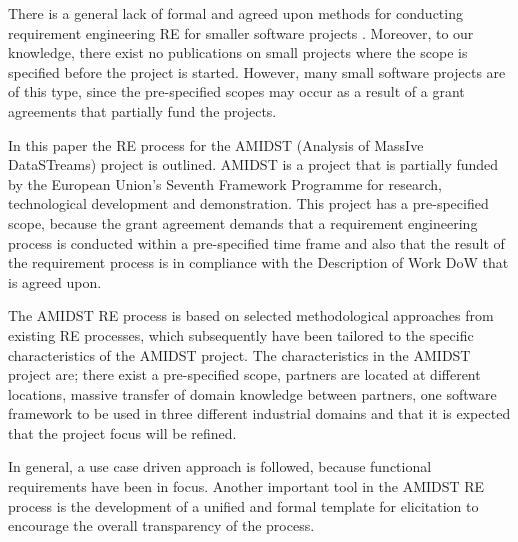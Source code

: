 There is a general lack of formal and agreed upon methods for conducting requirement engineering RE for smaller software projects \cite{Ara07,Qui10}.  Moreover, to our knowledge, there exist no publications on small projects where the scope is specified before the project is started.  However, many small software projects are of this type, since the pre-specified scopes may occur as a result of a grant agreements that partially fund the projects.  

In this paper the RE process for the AMIDST (Analysis of MassIve DataSTreams) project is outlined.  AMIDST is a project that is partially funded by the European Union's Seventh Framework Programme for research, technological development and demonstration.  This project has a pre-specified scope, because the grant agreement demands that a requirement engineering process is conducted within a pre-specified time frame and also that the result of the requirement process is in compliance with the Description of Work DoW that is agreed upon.   

The AMIDST RE process is based on selected methodological approaches from existing RE processes, which subsequently have been tailored to the specific characteristics of the AMIDST project.  The characteristics in the AMIDST project are; there exist a pre-specified scope, partners are located at different locations, massive transfer of domain knowledge between partners, one software framework to be used in three different industrial domains and that it is expected that the project focus will be refined.  

In general, a use case driven approach is followed, because functional requirements have been in focus. Another important tool in the AMIDST RE process is the development of a unified and formal template for elicitation to encourage the overall transparency of the process.